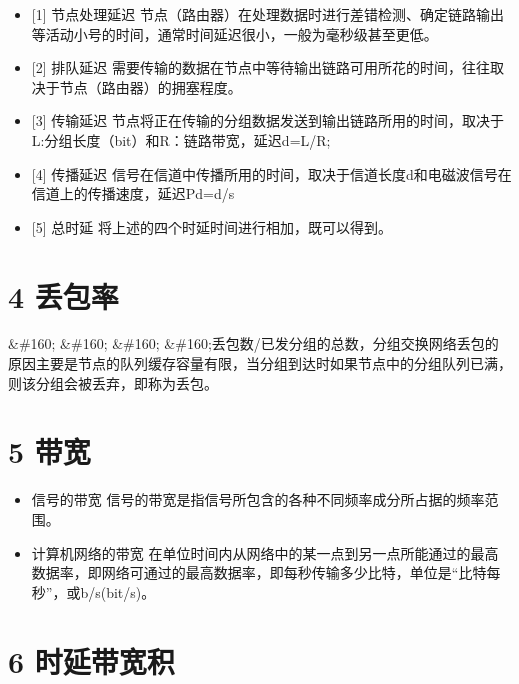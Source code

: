 \begin{itemize}
\item {[1]} 节点处理延迟
节点（路由器）在处理数据时进行差错检测、确定链路输出等活动小号的时间，通常时间延迟很小，一般为毫秒级甚至更低。

\item {[2]} 排队延迟
需要传输的数据在节点中等待输出链路可用所花的时间，往往取决于节点（路由器）的拥塞程度。

\item {[3]} 传输延迟
节点将正在传输的分组数据发送到输出链路所用的时间，取决于L:分组长度（bit）和R：链路带宽，延迟d=L\slash R;

\item {[4]} 传播延迟
信号在信道中传播所用的时间，取决于信道长度d和电磁波信号在信道上的传播速度，延迟Pd=d\slash s

\item {[5]} 总时延
将上述的四个时延时间进行相加，既可以得到。

\end{itemize}

\section{4 丢包率}
\label{4丢包率}

\&\#160; \&\#160; \&\#160; \&\#160;丢包数\slash 已发分组的总数，分组交换网络丢包的原因主要是节点的队列缓存容量有限，当分组到达时如果节点中的分组队列已满，则该分组会被丢弃，即称为丢包。

\section{5 带宽}
\label{5带宽}

\begin{itemize}
\item 信号的带宽
信号的带宽是指信号所包含的各种不同频率成分所占据的频率范围。

\item 计算机网络的带宽
在单位时间内从网络中的某一点到另一点所能通过的最高数据率，即网络可通过的最高数据率，即每秒传输多少比特，单位是“比特每秒”，或b\slash s(bit\slash s)。

\end{itemize}

\section{6 时延带宽积}
\label{6时延带宽积}

